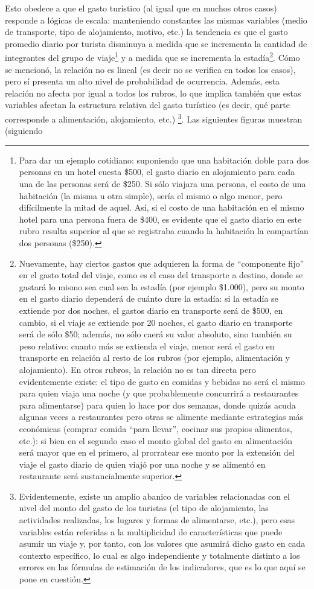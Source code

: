 \documentclass[
]{book}
\begin{document}
Esto obedece a que el gasto turístico (al igual que en muchos otros casos) responde a lógicas de escala: manteniendo constantes las mismas variables (medio de transporte, tipo de alojamiento, motivo, etc.) la tendencia es que el gasto promedio diario por turista disminuya a medida que se incrementa la cantidad de integrantes del grupo de viaje\footnote{Para dar un ejemplo cotidiano: suponiendo que una habitación doble para dos personas en un hotel cuesta \$500, el gasto diario en alojamiento para cada una de las personas será de \$250. Si sólo viajara una persona, el costo de una habitación (la misma u otra simple), sería el mismo o algo menor, pero difícilmente la mitad de aquel. Así, si el costo de una habitación en el mismo hotel para una persona fuera de \$400, es evidente que el gasto diario en este rubro resulta superior al que se registraba cuando la habitación la compartían dos personas (\$250).} y a medida que se incrementa la estadía\footnote{Nuevamente, hay ciertos gastos que adquieren la forma de ``componente fijo'' en el gasto total del viaje, como es el caso del transporte a destino, donde se gastará lo mismo sea cual sea la estadía (por ejemplo \$1.000), pero su monto en el gasto diario dependerá de cuánto dure la estadía: si la estadía se extiende por dos noches, el gastos diario en transporte será de \$500, en cambio, si el viaje se extiende por 20 noches, el gasto diario en transporte será de sólo \$50; además, no sólo caerá su valor absoluto, sino también su peso relativo: cuanto más se extienda el viaje, menor será el gasto en transporte en relación al resto de los rubros (por ejemplo, alimentación y alojamiento). En otros rubros, la relación no es tan directa pero evidentemente existe: el tipo de gasto en comidas y bebidas no será el mismo para quien viaja una noche (y que probablemente concurrirá a restaurantes para alimentarse) para quien lo hace por dos semanas, donde quizás acuda algunas veces a restaurantes pero otras se alimente mediante estrategias más económicas (comprar comida ``para llevar'', cocinar sus propios alimentos, etc.): si bien en el segundo caso el monto global del gasto en alimentación será mayor que en el primero, al prorratear ese monto por la extensión del viaje el gasto diario de quien viajó por una noche y se alimentó en restaurante será sustancialmente superior.}. Cómo se mencionó, la relación no es lineal (es decir no se verifica en todos los casos), pero sí presenta un alto nivel de probabilidad de ocurrencia. Además, esta relación no afecta por igual a todos los rubros, lo que implica también que estas variables afectan la estructura relativa del gasto turístico (es decir, qué parte corresponde a alimentación, alojamiento, etc.) \footnote{Evidentemente, existe un amplio abanico de variables relacionadas con el nivel del monto del gasto de los turistas (el tipo de alojamiento, las actividades realizadas, los lugares y formas de alimentarse, etc.), pero esas variables están referidas a la multiplicidad de características que puede asumir un viaje y, por tanto, con los valores que asumirá dicho gasto en cada contexto específico, lo cual es algo independiente y totalmente distinto a los errores en las fórmulas de estimación de los indicadores, que es lo que aquí se pone en cuestión.}. Las siguientes figuras muestran (siguiendo 
\end{document}
